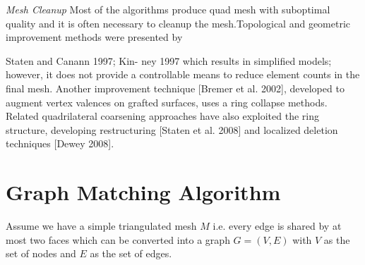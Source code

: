 \documentclass[11pt, a4paper]{paper}
\begin{document}
{\em Mesh Cleanup}
Most of the algorithms produce quad mesh with suboptimal quality and it is
often necessary to cleanup the mesh.Topological and geometric improvement
methods were presented by {Staten and Canann 1997; Kin- ney 1997 which 
results in simplified models; however, it does not provide a controllable 
means to reduce element counts in the final mesh. Another improvement 
technique [Bremer et al. 2002], developed to augment vertex valences on
grafted surfaces, uses a ring collapse methods. Related quadrilateral 
coarsening approaches have also exploited the ring structure, developing 
restructuring [Staten et al. 2008] and localized deletion techniques 
[Dewey 2008].


\section { Graph Matching Algorithm }
Assume we have a simple triangulated mesh $M $ i.e. every edge is shared by at most two faces which can
be converted into a graph $G = (V,E)$ with $V$ as the set of nodes and $E$ as
the set of edges.  



}
\end{document}
